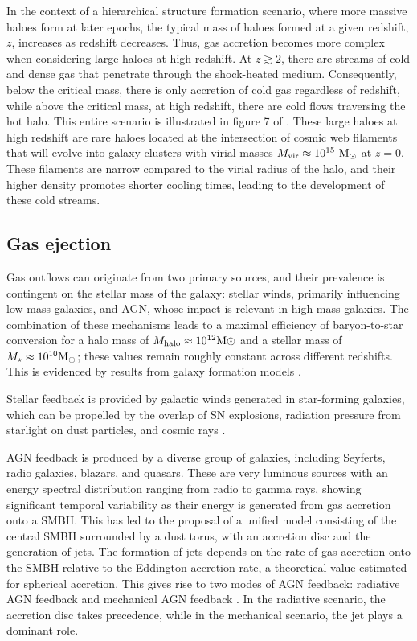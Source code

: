 \documentclass[baaa]{baaa}
\begin{document}
In the context of a hierarchical structure formation scenario, where more massive haloes form at later epochs, the typical mass of haloes formed at a given redshift, $z$, increases as redshift decreases. 
Thus, gas accretion becomes more complex when considering large haloes at high redshift. 
At $z\gtrsim 2$, there are streams of cold and dense gas that penetrate through the shock-heated medium.
Consequently, below the critical mass, there is only accretion of cold gas regardless of redshift, while above the critical mass, at high redshift, there are cold flows traversing the hot halo. This entire scenario is illustrated in figure 7 of \cite{DekelBirnboim_2006}.
These large haloes at high redshift are rare haloes located at the intersection of cosmic web filaments that will evolve into galaxy clusters with virial masses $M_{\rm vir}\approx 10^{15}~{\rm M}_{\odot}$ at $z=0$. These filaments are narrow compared to the virial radius of the halo, and their higher density promotes shorter cooling times, leading to the development of these cold streams. 
 
\subsection{Gas ejection}
\label{Sec:GasEjection}

Gas outflows can originate from two primary sources, and their prevalence is contingent on the stellar mass of the galaxy: stellar winds, primarily influencing low-mass galaxies, and AGN, whose impact is relevant in high-mass galaxies. The combination of these mechanisms leads to a maximal efficiency of baryon-to-star conversion for a halo mass of $M_{\rm halo}\approx 10^{12}{\rm M}{\odot}$ and a stellar mass of $M_{\star }\approx 10^{10}{\rm M}_{\odot}$; these values remain roughly constant across different redshifts.
This is evidenced by results from galaxy formation models \citep[e.g.][]{Henriques_2019}.

Stellar feedback is provided by galactic winds generated in star-forming galaxies, which can be propelled by the overlap of SN explosions, radiation pressure from starlight on dust particles, and cosmic rays \citep[see][for a review]{Zhang}. 

AGN feedback is produced by a diverse group of galaxies, including Seyferts, radio galaxies, blazars, and quasars.  These are very luminous sources with an energy spectral distribution ranging from radio to gamma rays, showing significant temporal variability as their energy is generated from gas accretion onto a SMBH. This has led to the proposal of a unified model consisting of the central SMBH surrounded by a dust torus, with an accretion disc and the generation of jets. The formation of jets depends on the rate of gas accretion onto the SMBH relative to the Eddington accretion rate, a theoretical value estimated for spherical accretion.
%
This gives rise to two modes of AGN feedback: radiative AGN feedback and mechanical AGN feedback \citep{Heckman_2014, 
 Harrison_2017}. In the radiative scenario, the accretion disc takes precedence, while in the mechanical scenario, the jet plays a dominant role.
 
\end{document}
